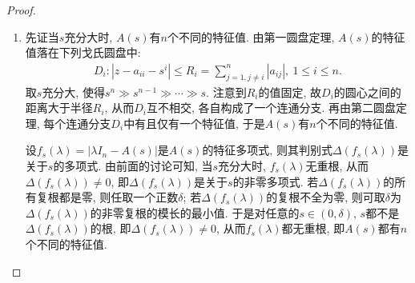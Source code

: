 \documentclass[../../main.tex]{subfiles}%
\begin{document}
\begin{proof}
\begin{enumerate}[(1)]
\item 先证当\(s\)充分大时, \(A(s)\)有\(n\)个不同的特征值. 由第一圆盘定理, \(A(s)\)的特征值落在下列戈氏圆盘中:
\begin{align*}
D_{i}:|z - a_{ii}-s^{i}| \leqslant  R_{i}=\sum_{j = 1,j\neq i}^{n}|a_{ij}|,\ 1 \leqslant  i \leqslant  n.
\end{align*}
取\(s\)充分大, 使得\(s^{n} \gg s^{n - 1} \gg \cdots \gg s\). 注意到\(R_{i}\)的值固定, 故\(D_{i}\)的圆心之间的距离大于半径\(R_{i}\), 从而\(D_{i}\)互不相交, 各自构成了一个连通分支. 再由第二圆盘定理, 每个连通分支\(D_{i}\)中有且仅有一个特征值, 于是\(A(s)\)有\(n\)个不同的特征值.

设\(f_{s}(\lambda)=|\lambda I_{n}-A(s)|\)是\(A(s)\)的特征多项式, 则其判别式\(\Delta(f_{s}(\lambda))\)是关于\(s\)的多项式. 由前面的讨论可知, 当\(s\)充分大时, \(f_{s}(\lambda)\)无重根, 从而\(\Delta(f_{s}(\lambda)) \neq 0\), 即\(\Delta(f_{s}(\lambda))\)是关于\(s\)的非零多项式. 若\(\Delta(f_{s}(\lambda))\)的所有复根都是零, 则任取一个正数\(\delta\); 若\(\Delta(f_{s}(\lambda))\)的复根不全为零, 则可取\(\delta\)为\(\Delta(f_{s}(\lambda))\)的非零复根的模长的最小值. 于是对任意的\(s \in (0,\delta)\), \(s\)都不是\(\Delta(f_{s}(\lambda))\)的根, 即\(\Delta(f_{s}(\lambda)) \neq 0\), 从而\(f_{s}(\lambda)\)都无重根, 即\(A(s)\)都有\(n\)个不同的特征值. 
\end{enumerate}

\end{proof}
\end{document}
